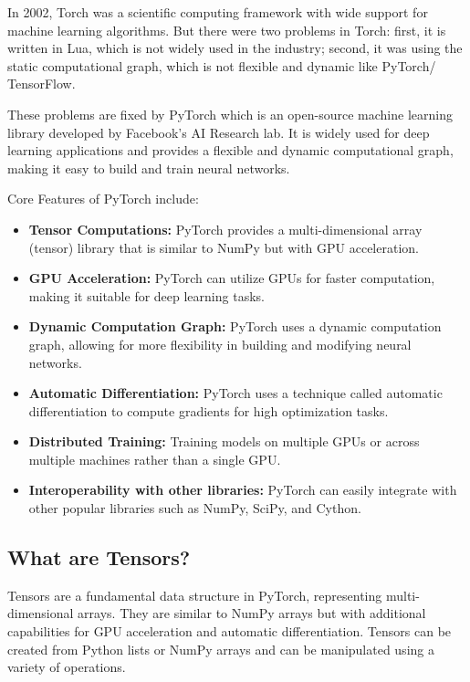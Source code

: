\documentclass[12pt, a4paper]{article}
\begin{document}
\vspace{1em}

In 2002, Torch was a scientific computing framework with wide support for machine learning algorithms. 
But there were two problems in Torch: first, it is written in Lua, which is not widely used in the industry; second, it was using the static computational graph, which is not flexible and dynamic like PyTorch/ TensorFlow.

\vspace{0.5em}

These problems are fixed by PyTorch which is an open-source machine learning library developed by Facebook's AI Research lab. It is widely used for deep learning applications and provides a flexible and dynamic computational graph, making it easy to build and train neural networks.

\vspace{0.5em}

Core Features of PyTorch include:
\begin{itemize}[nosep]
    \item \textbf{Tensor Computations:} PyTorch provides a multi-dimensional array (tensor) library that is similar to NumPy but with GPU acceleration.
    \item \textbf{GPU Acceleration:} PyTorch can utilize GPUs for faster computation, making it suitable for deep learning tasks.
    \item \textbf{Dynamic Computation Graph:} PyTorch uses a dynamic computation graph, allowing for more flexibility in building and modifying neural networks.
    \item \textbf{Automatic Differentiation:} PyTorch uses a technique called automatic differentiation to compute gradients for high optimization tasks.
    \item \textbf{Distributed Training:} Training models on multiple GPUs or across multiple machines rather than a single GPU.
    \item \textbf{Interoperability with other libraries:} PyTorch can easily integrate with other popular libraries such as NumPy, SciPy, and Cython.
\end{itemize}

\subsection{What are Tensors?}

Tensors are a fundamental data structure in PyTorch, representing multi-dimensional arrays. They are similar to NumPy arrays but with additional capabilities for GPU acceleration and automatic differentiation. Tensors can be created from Python lists or NumPy arrays and can be manipulated using a variety of operations.
\end{document}
